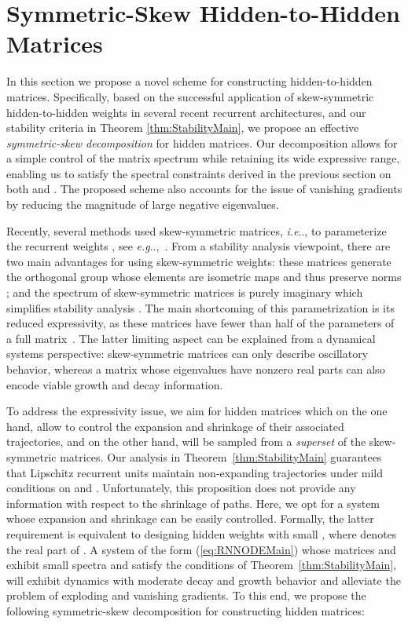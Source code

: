 \documentclass{article} \usepackage{iclr2021_conference,times}
\makeatletter
\DeclareRobustCommand\onedot{\futurelet\@let@token\@onedot}
\def\@onedot{\ifx\@let@token.\else.\null\fi\xspace}
\def\eg{\emph{e.g}\onedot} \def\Eg{\emph{E.g}\onedot}
\def\ie{\emph{i.e}\onedot} \def\Ie{\emph{I.e}\onedot}
\makeatother
\begin{document}
\section{Symmetric-Skew Hidden-to-Hidden Matrices}
\label{sec:hidden_scheme}

In this section we propose a novel scheme for constructing hidden-to-hidden matrices.
Specifically, based on the successful application of skew-symmetric hidden-to-hidden weights in several recent recurrent architectures, and our stability criteria in Theorem \ref{thm:StabilityMain}, we propose an effective \emph{symmetric-skew decomposition} for hidden matrices. Our decomposition allows for a simple control of the matrix spectrum while retaining its wide expressive range, enabling us to satisfy the spectral constraints derived in the previous section on both  and . The proposed scheme also accounts for the issue of vanishing gradients by reducing the magnitude of large negative eigenvalues.

Recently, several methods used skew-symmetric matrices, \ie,  to parameterize the recurrent weights , see \eg,~\citep{wisdom2016full,chang2018antisymmetricrnn}. From a stability analysis viewpoint, there are two main advantages for using skew-symmetric weights: these matrices generate the orthogonal group whose elements are isometric maps and thus preserve norms \citep{lezcano2019cheap}; and the spectrum of skew-symmetric matrices is purely imaginary which simplifies stability analysis \citep{chang2018antisymmetricrnn}.
The main shortcoming of this parametrization is its reduced expressivity, as these matrices have fewer than half of the parameters of a full matrix~\citep{kerg2019non}. The latter limiting aspect can be explained from a dynamical systems perspective: skew-symmetric matrices can only describe oscillatory behavior, whereas a matrix whose eigenvalues have nonzero real parts can also encode viable growth and decay information.

To address the expressivity issue, we aim for hidden matrices which on the one hand, allow to control the expansion and shrinkage of their associated trajectories, and on the other hand, will be sampled from a \emph{superset} of the skew-symmetric matrices. Our analysis in Theorem~\ref{thm:StabilityMain} guarantees that Lipschitz recurrent units maintain non-expanding trajectories under mild conditions on  and . Unfortunately, this proposition does not provide any information with respect to the shrinkage of paths. Here, we opt for a system whose expansion and shrinkage can be easily controlled. Formally, the latter requirement is equivalent to designing hidden weights  with small , where  denotes the real part of . A system of the form (\ref{eq:RNNODEMain}) whose matrices  and  exhibit small spectra and satisfy the conditions of Theorem~\ref{thm:StabilityMain}, will exhibit dynamics with moderate decay and growth behavior and alleviate the problem of exploding and vanishing gradients. To this end, we propose the following symmetric-skew decomposition for constructing hidden matrices:
\end{document}
